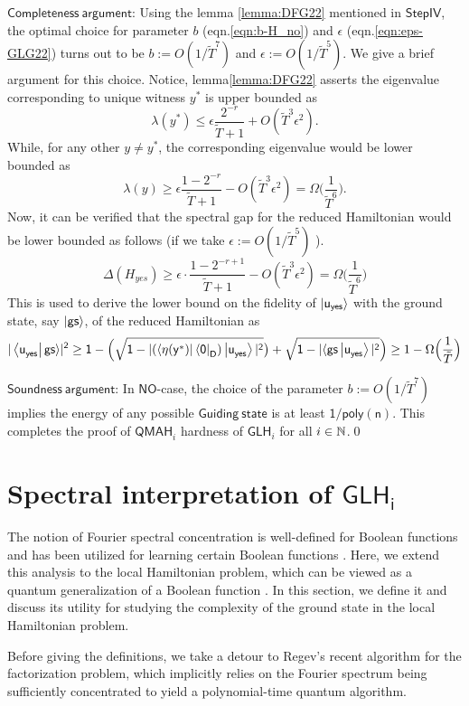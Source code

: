 \documentclass[11pt]{article}
\newcommand{\ms}[1]{\mathsf{#1}}
\begin{document}
$\mathsf{Completeness\ argument}$: Using the lemma \ref{lemma:DFG22} mentioned in $\mathsf{Step IV}$, the optimal choice for parameter $b$ (eqn.\ref{eqn:b-H_no}) and $\epsilon$ (eqn.\ref{eqn:eps-GLG22}) turns out to be $b:=O(1/\tilde{T}^7)$ and $\epsilon := O(1/\tilde{T}^5)$. We give a brief argument for this choice. Notice, lemma\ref{lemma:DFG22} asserts the eigenvalue corresponding to unique witness $y^*$ is upper bounded as
\begin{equation}
    \lambda(y^*)\leq \epsilon \frac{2^{-r}}{\tilde{T}+1}+O(\tilde{T}^3\epsilon^2).
\end{equation}
While, for any other $y\neq y^*$, the corresponding eigenvalue would be lower bounded as
\begin{equation}
    \lambda(y) \geq  \epsilon  \frac{1-2^{-r}}{\tilde{T}+1}-O(\tilde{T}^3\epsilon^2) = \Omega\Big( \frac{1}{\tilde{T}^6}\Big).
\end{equation}
Now, it can be verified that the spectral gap for the reduced Hamiltonian would be lower bounded as follows (if we take $\epsilon:= O(1/\tilde{T}^5)$ ).
\begin{equation}
    \Delta(H_{yes})\geq \epsilon\cdot\frac{1-2^{-r+1}}{\tilde{T}+1}-O(\tilde{T}^3\epsilon^2)=\Omega\Big( \frac{1}{\tilde{T}^6}\Big)
\end{equation}
This is used to derive the lower bound on the fidelity of $\mathsf{\ket{u_{yes}}}$ with the ground state, say $\mathsf{\ket{gs}}$, of the reduced Hamiltonian as
\begin{equation}\label{eqn:beta-GuLH-fidelity-final}
    \mathsf{    |\bra{u_{yes}^{}}{gs}\rangle|^2 \geq 1-\Big(\sqrt{1-|(\bra{\eta(y^*)}\bra{0}_D)\ket{u_{yes}^{}}|^2} \big) + \sqrt{1-|\langle gs\ket{u_{yes}^{}}|^2}}\Big)\geq 1-\Omega \Big(\frac{1}{\tilde{T}}\Big)
\end{equation}

$\mathsf{Soundness\ argument}$: In $\mathsf{NO}$-case, the choice of the parameter $b:=O(1/\tilde{T}^7)$ implies the energy of any possible $\mathsf{Guiding\ state}$ is at least $\mathsf{1/poly(n)}$. This completes the proof of $\ms{QMAH}_i$ hardness of $\ms{GLH}_i$ for all $i\in \mathbb{N}$.\qed


\section{Spectral interpretation of $\ms{GLH_i}$ }\label{sec: spectral}
The notion of Fourier spectral concentration is well-defined for Boolean functions and has been utilized for learning certain Boolean functions \cite{o2014analysis, palem2022quantum}. Here, we extend this analysis to the local Hamiltonian problem, which can be viewed as a quantum generalization of a Boolean function \cite{montanaro2008quantum}. In this section, we define it and discuss its utility for studying the complexity of the ground state in the local Hamiltonian problem.\par
Before giving the definitions, we take a detour to Regev's recent algorithm for the factorization problem, which implicitly relies on the Fourier spectrum being sufficiently concentrated to yield a polynomial-time quantum algorithm.
\end{document}
